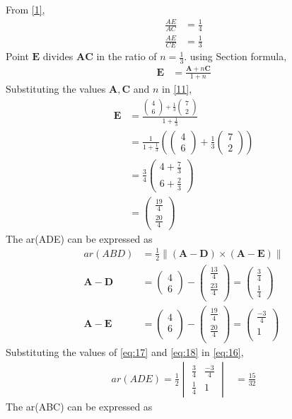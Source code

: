 \documentclass[12pt]{article}
\newcommand{\mydet}[1]{\ensuremath{\begin{vmatrix}#1\end{vmatrix}}}
\providecommand{\brak}[1]{\ensuremath{\left(#1\right)}}
\providecommand{\norm}[1]{\left\lVert#1\right\rVert}
\newcommand{\myvec}[1]{\ensuremath{\begin{pmatrix}#1\end{pmatrix}}}
\let\vec\mathbf
\begin{document}
\begin{enumerate}
From \eqref{1},
\begin{align}
\frac{AE}{AC} &=\frac{1}{4}\\
\frac{AE}{CE} &=\frac{1}{3}
\end{align}
Point $\vec{E}$ divides $\vec{A}\vec{C}$ in the ratio of $n = \frac{1}{3}$.
using Section formula,
\begin{align}
\vec{E} &=\frac{\vec{A}+n\vec{C}}{1+n}\label{11}
\end{align}
Substituting the values $\vec{A},\vec{C}$ and $n$ in \eqref{11},
\begin{align}
\vec{E} &=\frac{{\myvec{4\\6}+\frac{1}{3}\myvec{7\\2}}}{1+\frac{1}{3}}\\
	&=\frac{1}{1+\frac{1}{3}}\brak{{\myvec{4\\6}+\frac{1}{3}\myvec{7\\2}}} \\
	&=\frac{3}{4}\myvec{4+\frac{7}{3}\\[2pt]6+\frac{2}{3}}\\
	&=\myvec{\frac{19}{4}\\[2pt] \frac{20}{4}}
\end{align}
The ar(ADE) can be expressed as
\begin{align}
	ar(ABD) &=\frac{1}{2} \norm{\brak{\vec{A}-\vec{D}}  \times 
   \brak{\vec{A}- \vec{E}}} \label{eq:16} \\
	\vec{A}- \vec{D} &= \myvec{4\\6}-\myvec{\frac{13}{4}\\[2pt] \frac{23}{4}\\}=\myvec{\frac{3}{4}\\[2pt] \frac{1}{4}}\label{eq:17}\\
	  \vec{A}- \vec{E} &= \myvec{4\\6\\}-\myvec{\frac{19}{4}\\[2pt] \frac{20}{4}\\}=\myvec{\frac{-3}{4}\\[2pt]1\\}\label{eq:18}
  \end{align}
Substituting the values of \eqref{eq:17} and \eqref{eq:18} in \eqref{eq:16},
\begin{align}
	ar(ADE)=\frac{1}{2}\mydet{\frac{3}{4} & \frac{-3}{4}\\[2pt] \frac{1}{4} & 1}  
	&=	\frac{15}{32}
\end{align}
The ar(ABC) can be expressed as
  \begin{align}

\end{align}
\end{enumerate}
\end{document}

